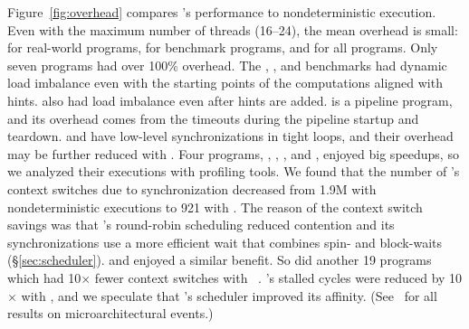 Figure~\ref{fig:overhead} compares \parrot's performance to nondeterministic
execution.  Even with the maximum number of threads (16--24), the mean
overhead is small: \meanrealoverhead for real-world programs, \meanbenchoverhead for benchmark
programs, and \meanoverhead for all programs.
Only seven programs had over 100\% overhead.  The \ferret, \freqmine, and \is benchmarks
had dynamic load imbalance even with the starting points of the computations
aligned with \compute hints. \ua also had load 
imbalance even after \nondet hints are added.
\xtwosixfour is a pipeline program, and its overhead
comes from the \compute timeouts during the pipeline startup and
teardown.  \rtviewraytrace and \barnes have low-level
synchronizations in tight loops, and their overhead may be further reduced
with \nondets.  Four programs, \mencoder, \bodytrackopenmp, \facesim, and
\linearregrepthread, enjoyed big speedups, so we analyzed their 
executions with profiling tools. We found that the number of \mencoder's 
context switches due to synchronization decreased from 1.9M with
nondeterministic executions to 921 with \parrot.  The reason of the context
switch savings was that \parrot's round-robin scheduling reduced contention
and its synchronizations use a more efficient wait that combines spin- and
block-waits (\S\ref{sec:scheduler}).  \bodytrackopenmp and \facesim
enjoyed a similar benefit.  So did another 19 programs which had
10$\times$ fewer context switches with
\parrot~\cite{Parrot:github}. \linearregrepthread's stalled cycles were
reduced by 10$\times$ with \parrot, and we speculate that \parrot's scheduler
improved its affinity. (See~\cite{Parrot:github} for all results on
microarchitectural events.)




